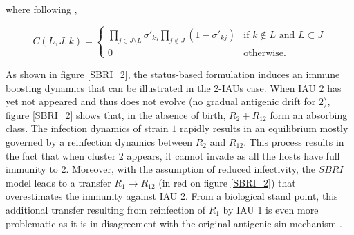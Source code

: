 where following \citet{Gog2002a}, 

$$C(L,J,k)=
\begin{cases}
  \prod_{j \in J \setminus L} \sigma'_{kj} \prod_{j \notin J}
  (1-\sigma'_{kj}) & \text{if } k \notin L \text{ and } L \subset J \\
  0 & \text{otherwise.}
\end{cases}$$


As shown in figure \ref{SBRI_2}, the status-based formulation induces
an immune boosting dynamics that can be illustrated in the 2-IAUs
case. When IAU $2$ has yet not appeared and thus does not evolve (no
gradual antigenic drift for $2$), figure \ref{SBRI_2} shows that, in
the absence of birth, $R_{2}+R_{12}$ form an absorbing class. The
infection dynamics of strain $1$ rapidly results in an equilibrium
mostly governed by a reinfection dynamics between $R_2$ and
$R_{12}$. This process results in the fact that when cluster $2$
appears, it cannot invade as all the hosts have full immunity to
$2$. Moreover, with the assumption of reduced infectivity, the $SBRI$
model leads to a transfer $R_{1}\to R_{12}$ (in red on figure
\ref{SBRI_2}) that overestimates the immunity against IAU 2. From a
biological stand point, this additional transfer resulting from
reinfection of $R_1$ by IAU 1 is even more problematic as it is in
disagreement with the original antigenic sin mechanism
\citep{Ballesteros2009}.

